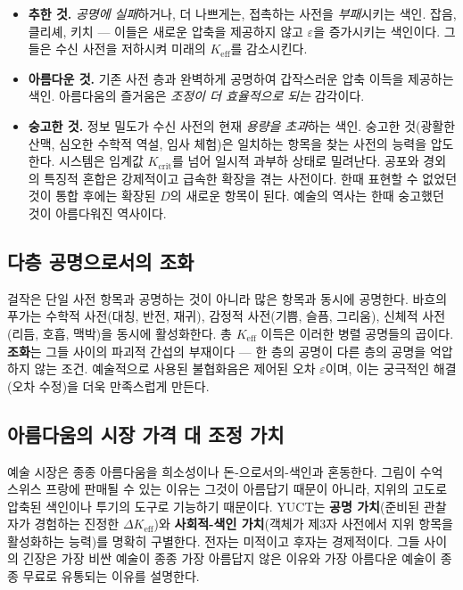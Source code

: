\documentclass[12pt,a4paper]{article}
\newcommand{\Keff}{K_{\mathrm{eff}}}
\begin{document}
	\begin{itemize}[leftmargin=*]
		\item \textbf{추한 것.} \emph{공명에 실패}하거나, 더 나쁘게는, 접촉하는 사전을 \emph{부패}시키는 색인. 잡음, 클리셰, 키치 — 이들은 새로운 압축을 제공하지 않고 \(\varepsilon\)을 증가시키는 색인이다. 그들은 수신 사전을 저하시켜 미래의 \(K_{\mathrm{eff}}\)를 감소시킨다.
		\item \textbf{아름다운 것.} 기존 사전 층과 완벽하게 공명하여 갑작스러운 압축 이득을 제공하는 색인. 아름다움의 즐거움은 \emph{조정이 더 효율적으로 되는} 감각이다.
		\item \textbf{숭고한 것.} 정보 밀도가 수신 사전의 현재 \emph{용량을 초과}하는 색인. 숭고한 것(광활한 산맥, 심오한 수학적 역설, 임사 체험)은 일치하는 항목을 찾는 사전의 능력을 압도한다. 시스템은 임계값 \(K_{\mathrm{crit}}\)를 넘어 일시적 과부하 상태로 밀려난다. 공포와 경외의 특징적 혼합은 강제적이고 급속한 확장을 겪는 사전이다. 한때 표현할 수 없었던 것이 통합 후에는 확장된 \(D\)의 새로운 항목이 된다. 예술의 역사는 한때 숭고했던 것이 아름다워진 역사이다.
	\end{itemize}
	
	\subsection{다층 공명으로서의 조화}
	
	걸작은 단일 사전 항목과 공명하는 것이 아니라 많은 항목과 동시에 공명한다. 바흐의 푸가는 수학적 사전(대칭, 반전, 재귀), 감정적 사전(기쁨, 슬픔, 그리움), 신체적 사전(리듬, 호흡, 맥박)을 동시에 활성화한다. 총 \(K_{\mathrm{eff}}\) 이득은 이러한 병렬 공명들의 곱이다. \textbf{조화}는 그들 사이의 파괴적 간섭의 부재이다 — 한 층의 공명이 다른 층의 공명을 억압하지 않는 조건. 예술적으로 사용된 불협화음은 제어된 오차 \(\varepsilon\)이며, 이는 궁극적인 해결(오차 수정)을 더욱 만족스럽게 만든다.
	
	\subsection{아름다움의 시장 가격 대 조정 가치}
	
	예술 시장은 종종 아름다움을 희소성이나 돈-으로서의-색인과 혼동한다. 그림이 수억 스위스 프랑에 판매될 수 있는 이유는 그것이 아름답기 때문이 아니라, 지위의 고도로 압축된 색인이나 투기의 도구로 기능하기 때문이다. YUCT는 \textbf{공명 가치}(준비된 관찰자가 경험하는 진정한 \(\Delta\Keff\))와 \textbf{사회적-색인 가치}(객체가 제3자 사전에서 지위 항목을 활성화하는 능력)를 명확히 구별한다. 전자는 미적이고 후자는 경제적이다. 그들 사이의 긴장은 가장 비싼 예술이 종종 가장 아름답지 않은 이유와 가장 아름다운 예술이 종종 무료로 유통되는 이유를 설명한다.
	
\end{document}
